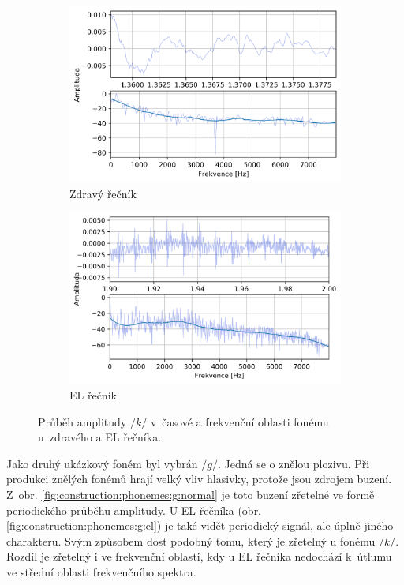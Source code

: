 \begin{figure}[htpb]
  \centering
  \begin{subfigure}[b]{0.45\textwidth}
    \includegraphics[width=\textwidth]{./ch5-construction/img/signal-normal_k.png}
    \caption{Zdravý řečník}
    \label{fig:construction:phonemes:k:normal}
  \end{subfigure}
  \begin{subfigure}[b]{0.45\textwidth}
    \includegraphics[width=\textwidth]{./ch5-construction/img/signal-el_k.png}
    \caption{EL řečník}
    \label{fig:construction:phonemes:k:el}
  \end{subfigure}
  \caption[Průběh amplitudy fonému $/k/$ zdravého a EL řečníka.]{Průběh amplitudy $/k/$ v~časové a frekvenční oblasti fonému u~zdravého a EL řečníka.}
  \label{fig:construction:phonemes:k}
\end{figure}

Jako druhý ukázkový foném byl vybrán $/g/$.
Jedná se o znělou plozivu.
Při produkci znělých fonémů hrají velký vliv hlasivky, protože jsou zdrojem buzení.
Z~obr. \ref{fig:construction:phonemes:g:normal} je toto buzení zřetelné ve formě periodického průběhu amplitudy.
U EL řečníka (obr. \ref{fig:construction:phonemes:g:el}) je také vidět periodický signál, ale úplně jiného charakteru.
Svým způsobem dost podobný tomu, který je zřetelný u fonému $/k/$.
Rozdíl je zřetelný i ve frekvenční oblasti, kdy u EL řečníka nedochází  k~útlumu ve střední oblasti frekvenčního spektra.


